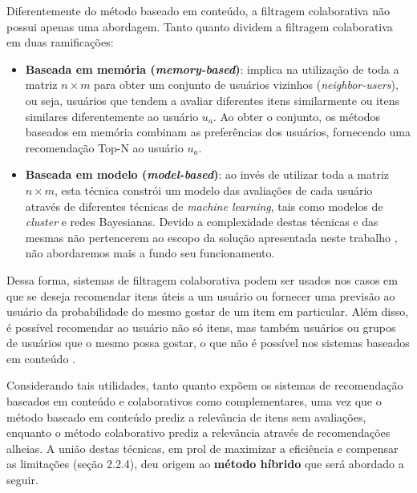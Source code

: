 \documentclass[12pt, openright, oneside, a4paper, brazil]{abntex2}
\begin{document}
Diferentemente do método baseado em conteúdo, a filtragem colaborativa não possui apenas uma abordagem.     Tanto  quanto  dividem a filtragem colaborativa em duas ramificações:

\begin{itemize}

	\item \textbf{Baseada em memória (\textit{memory-based})}: implica na utilização de toda a matriz $n \times m$ para obter um conjunto de usuários vizinhos (\textit{neighbor-users}), ou seja, usuários que tendem a avaliar diferentes itens similarmente ou itens similares diferentemente ao usuário $u_{a}$. Ao obter o conjunto, os métodos baseados em memória combinam as preferências dos usuários, fornecendo uma recomendação Top-N ao usuário $u_{a}$.

	\item \textbf{Baseada em modelo (\textit{model-based})}: ao invés de utilizar toda a matriz $n \times m$, esta técnica constrói um modelo das avaliações de cada usuário através de diferentes técnicas de \textit{machine learning}, tais como modelos de \textit{cluster} e redes Bayesianas. Devido a complexidade destas técnicas e das mesmas não pertencerem ao escopo da solução apresentada neste trabalho , não abordaremos mais a fundo seu funcionamento.

\end{itemize}

Dessa forma, sistemas de filtragem colaborativa podem ser usados nos casos em que se deseja recomendar itens úteis a um usuário ou fornecer uma previsão ao usuário da probabilidade do mesmo gostar de um item em particular. Além disso, é possível recomendar ao usuário não só itens, mas também usuários ou grupos de usuários que o mesmo possa gostar, o que não é possível nos sistemas baseados em conteúdo \cite{schafer2007collaborative}.

Considerando tais utilidades, tanto  quanto  expõem os sistemas de recomendação baseados em conteúdo e colaborativos como complementares, uma vez que o método baseado em conteúdo prediz a relevância de itens sem avaliações, enquanto o método colaborativo prediz a relevância através de recomendações alheias. A união destas técnicas, em prol de maximizar a eficiência e compensar as limitações (seção 2.2.4), deu origem ao \textbf{método híbrido} que será abordado a seguir.
\end{document}
